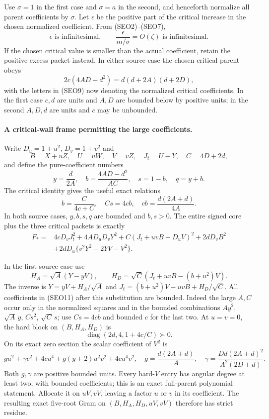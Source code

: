 Use $\sigma=1$ in the first case and $\sigma=a$ in the second,
and henceforth normalize all parent coefficients by $\sigma$.
Let $\epsilon$ be the positive part of the critical increase in the
chosen normalized coefficient. From (SEO2)--(SEO7),
\[
 \epsilon\text{ is infinitesimal},\qquad
 \frac{\epsilon}{m/\sigma}=O(\zeta)\text{ is infinitesimal}.
 \tag{SEO8}
\]
If the chosen critical value is smaller than the actual coefficient,
retain the positive excess packet instead. In either source case
the chosen critical parent obeys
\[
 2c(4AD-d^2)=d(d+2A)(d+2D),                  \tag{SEO9}
\]
with the letters in (SEO9) now denoting the normalized critical
coefficients. In the first case $c,d$ are units and $A,D$ are
bounded below by positive units; in the second $A,D,d$ are units
and $c$ may be unbounded.

\paragraph{A critical-wall frame permitting the large coefficients.}
Write $D_u=1+u^2$, $D_v=1+v^2$ and
\[
 B=X+uZ,\quad U=uW,\quad V=vZ,\quad J_t=U-Y,
 \quad C=4D+2d,
\]
and define the pure-coefficient numbers
\[
 y=\frac d{2A},\quad
 b=\frac{4AD-d^2}{AC},\quad s=1-b,\quad q=y+b.
\]
The critical identity gives the useful exact relations
\[
 b=\frac C{4c+C},\quad Cs=4cb,\quad
 cb=\frac{d(2A+d)}{4A}.                         \tag{SEO10}
\]
In both source cases, $y,b,s,q$ are bounded and $b,s>0$.
The entire signed core plus the three critical packets is exactly
\begin{align*}
 F_*={}&4cD_vJ_t^2+4AD_uD_vY^2
       +C(J_t+uvB-D_uV)^2+2dD_vB^2\\
       &+2dD_u\{v^2Y^2-2YV-V^2\}.              \tag{SEO11}
\end{align*}

In the first source case use
\[
 H_A=\sqrt A(Y-yV),\qquad
 H_D=\sqrt C(J_t+uvB-(b+u^2)V).
 \tag{SEO12}
\]
The inverse is $Y=yV+H_A/\sqrt A$ and
$J_t=(b+u^2)V-uvB+H_D/\sqrt C$.
All coefficients in (SEO11) after this substitution are bounded.
Indeed the large $A,C$ occur only in the normalized squares and in
the bounded combinations $Ay^2$, $\sqrt A\,y$, $Cs^2$,
$\sqrt C\,s$; use $Cs=4cb$ and bounded $c$ for the last two.
At $u=v=0$, the hard block on $(B,H_A,H_D)$ is
\[
 \operatorname{diag}(2d,4,1+4c/C)\succ0.
\]
On its exact zero section the scalar coefficient of $V^2$ is
\[
 g u^2+\gamma v^2+4cu^4+g(y+2)u^2v^2+4cu^4v^2,
 \quad g=\frac{d(2A+d)}A,\quad
 \gamma=\frac{Dd(2A+d)^2}{A^2(2D+d)}.             \tag{SEO13}
\]
Both $g,\gamma$ are positive bounded units. Every hard-$V$ entry
has angular degree at least two, with bounded coefficients; this is
an exact full-parent polynomial statement. Allocate it on $uV,vV$,
leaving a factor $u$ or $v$ in its coefficient. The resulting exact
five-root Gram on $(B,H_A,H_D,uV,vV)$ therefore has strict residue.

